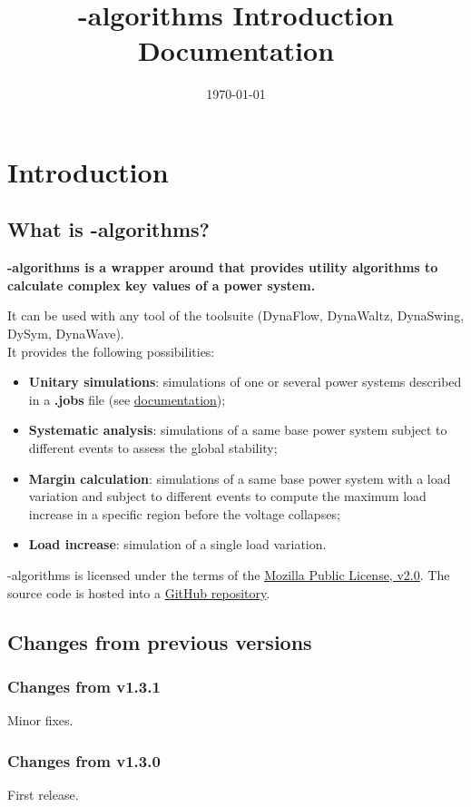 \documentclass[a4paper, 12pt]{report}
\begin{document}
\title{\Dynawo-algorithms Introduction Documentation}
\date\today

\maketitle
\tableofcontents

\chapter{Introduction}

\section{What is \Dynawo-algorithms?}

\textbf{\Dynawo-algorithms is a wrapper around  \href{https://dynawo.github.io/}{\underline{\Dynawo}} 
that provides utility algorithms to calculate complex key values of a power system.} 

It can be used with any tool of the \Dynawo toolsuite (DynaFlow, DynaWaltz, DynaSwing, DySym, DynaWave).\\

It provides the following possibilities:
\begin{itemize}
  \item \textbf{Unitary simulations}: simulations of one or several power systems described in a \textbf{.jobs} file 
  (see \href{https://github.com/dynawo/dynawo-algorithms/releases/download/v1.3.2/DynawoAlgorithmsDocumentation.pdf}{\underline{\Dynawo documentation}});
  \item \textbf{Systematic analysis}: simulations of a same base power system subject to different events to assess the global stability;
  \item \textbf{Margin calculation}: simulations of a same base power system with a load variation and subject to different events to compute 
  the maximum load increase in a specific region before the voltage collapses;
  \item \textbf{Load increase}: simulation of a single load variation.
\end{itemize}

\Dynawo-algorithms is licensed under the terms of the \href{http://mozilla.org/MPL/2.0}{\underline{Mozilla Public License, v2.0}}.
The source code is hosted into a \href{https://github.com/dynawo/dynawo-algorithms} {\underline{GitHub repository}}. \\

\section{Changes from previous versions}

\subsection{Changes from v1.3.1}
Minor fixes.

\subsection{Changes from v1.3.0}
First release.
\end{document}
